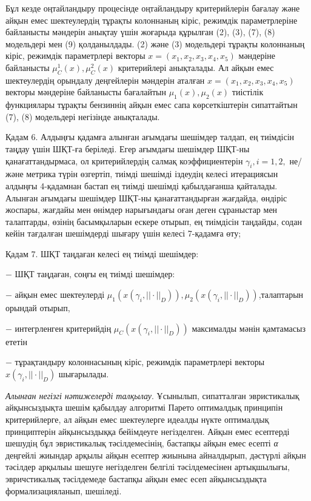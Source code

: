 \begin{multicols}{2}
Бұл кезде оңтайландыру процесінде оңтайландыру критерийлерін бағалау
және айқын емес шектеулердің тұрақты колоннаның кіріс, режимдік
параметрлеріне байланысты мәндерін анықтау үшін жоғарыда құрылған (2),
(3), (7), (8) модельдері мен (9) қолданылдады. (2) және (3) модельдері
тұрақты колоннаның кіріс, режимдік параметрлері векторы
$x=(x_1,x_2,x_3,x_4,x_5)$ мәндеріне байланысты
$\mu_C^1(x),\mu_C^2(x)$ критерийлері анықталады. Ал айқын
емес шектеулердің орындалу деңгейлерін мәндерін аталған
$x=(x_1,x_2,x_3,x_4,x_5)$ векторы мәндеріне байланысты
бағалайтын $\mu_1(x),\mu_2(x)$ тиістілік функциялары
тұрақты бензиннің айқын емес сапа көрсеткіштерін сипаттайтын (7), (8)
модельдері негізінде анықталады.

Қадам 6. Алдыңғы қадамға алынған ағымдағы шешімдер талдап, ең тиімдісін
таңдау үшін ШҚТ-ға беріледі. Егер ағымдағы шешімдер ШҚТ-ны
қанағаттандырмаса, ол критерийлердің салмақ
коэффициентерін $\gamma_i,i=1,2,$ не/және метрика түрін
өзгертіп, тиімді шешімді іздеудің келесі итерациясын алдыңғы 4-қадамнан
бастап ең тиімді шешімді қабылдағанша қайталады. Алынған ағымдағы
шешімдер ШҚТ-ны қанағаттандырған жағдайда, өндіріс жоспары, жағдайы мен
өнімдер нарығындағы оған деген сұраныстар мен талаптарды, өзінің
басымқыларын ескере отырып, ең тиімдісін таңдайды, содан кейін тағдалған
шешімдерді шығару үшін келесі 7-қадамға өту;

Қадам 7. ШҚТ таңдаған келесі ең тиімді шешімдер:

− ШҚТ таңдаған, соңғы ең тиімді шешімдер:

− айқын емес шектеулерді
$\mu_1(x(\gamma_i,||\cdot||_D)),\mu_2(x(\gamma_i,||\cdot||_D))$,талаптарын
орындай отырып,

− интегрленген критерийдің $\mu_C(x(\gamma_i,||\cdot||_D))$
максималды мәнін қамтамасыз ететін

− тұрақтандыру колоннасының кіріс, режимдік параметрлері векторы
$x(\gamma_i,||\cdot||_D)$ шығарылады.

\emph{Алынған негізгі нәтижелерді талқылау}. Ұсынылып, сипатталған
эвристикалық айқынсыздықта шешім қабылдау алгоритмі Парето оптималдық
принципін критерийлерге, ал айқын емес шектеулерге идеалды нүкте
оптималдық принциптерін айқынсыздыққа бейімдеуге негізделген. Айқын емес
есептерді шешудің бұл эвристикалық тәсілдемесінің, бастапқы айқын емес
есепті \emph{α} деңгейлі жиындар арқылы айқын есептер жиынына
айналдырып, дәстүрлі айқын тәсілдер арқылыы шешуге негізделген белгілі
тәсілдемесінен артықшылығы, эвричстикалық тәсілдемеде бастапқы айқын
емес есеп айқынсыздықта формализацияланып, шешіледі.


\end{multicols}
